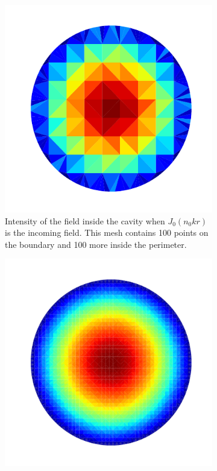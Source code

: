\begin{figure}
	\centering
	\begin{subfigure}{0.47\textwidth}
		\centering
		\includegraphics[width=\textwidth]{figs/backmatter/intensityTest-100.pdf}
		\caption[Intensity of the field inside the cavity]
				{Intensity of the field inside the cavity when
				$J_0(n_0kr)$ is the incoming field. This mesh contains
				100 points on the boundary and 100 more inside the perimeter.}
		\label{fig:app.numMethods.field.100}
	\end{subfigure}
	\hfill
	\begin{subfigure}{0.47\textwidth}
		\centering
		\includegraphics[width=\textwidth]{figs/backmatter/intensityTest-2000.pdf}

\end{subfigure}
\end{figure}
